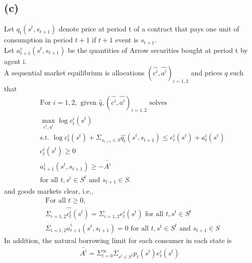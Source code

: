 \documentclass{ltjsarticle}
\begin{document}
\subsection*{(c)}
Let $q_t(s^t, s_{t+1})$ denote price at period t of a contract that pays one unit of consumption in period $t+1$ if $t+1$ event is $s_{t+1}$.\\
Let $a_{t+1}^i(s^t, s_{t+1})$ be the quantities of Arrow securities bought at period t by agent i.\\
A sequential market equilibrium is allocations $(\hat{c^i}, \hat{a^i})_{i = 1, 2}$ and prices $\hat{q}$ such that
\begin{align*}
    & \text{For }i = 1, 2, \text{ given }\hat{q}, (\hat{c^i}, \hat{a^i})_{i = 1, 2} \text{ solves}\\
    & \max_{c^i, a^i} \log c^i_t(s^t)\\
    & \text{s.t. }\log c_t^i(s^t) + \Sigma_{s_{t+1} \in S} \hat{q_t}(s^t, s_{t+1}) \leq e_t^i(s^t) + a_t^i(s^t)\\
    & c_t^i(s^t) \geq 0\\
    & a_{t+1}^i(s^t, s_{t+1}) \geq - \bar{A^i}\\
    & \text{for all }t, s^t \in S^t \text{ and }s_{t+1} \in S.
\end{align*}
and goods markets clear, i.e.,
\begin{align*}
    & \text{For all }t \geq 0,\\
    & \Sigma_{i = 1, 2} \hat{c_t^i}(s^t) = \Sigma_{i = 1, 2} e_t^i(s^t) \text{ for all }t, s^t \in S^t\\
    & \Sigma_{i = 1, 2} \hat{a}_{t+1}^i (s^t, s_{t+1}) = 0 \text{ for all }t, s^t \in S^t \text{ and }s_{t+1} \in S
\end{align*}
In addition, the natural borrowing limit for each consumer in each state is
\begin{align*}
    \bar{A^i} = \Sigma_{t=0}^\infty \Sigma_{s^t \in S^t} p_t(s^t) e_t^i(s^t)
\end{align*}
\end{document}

